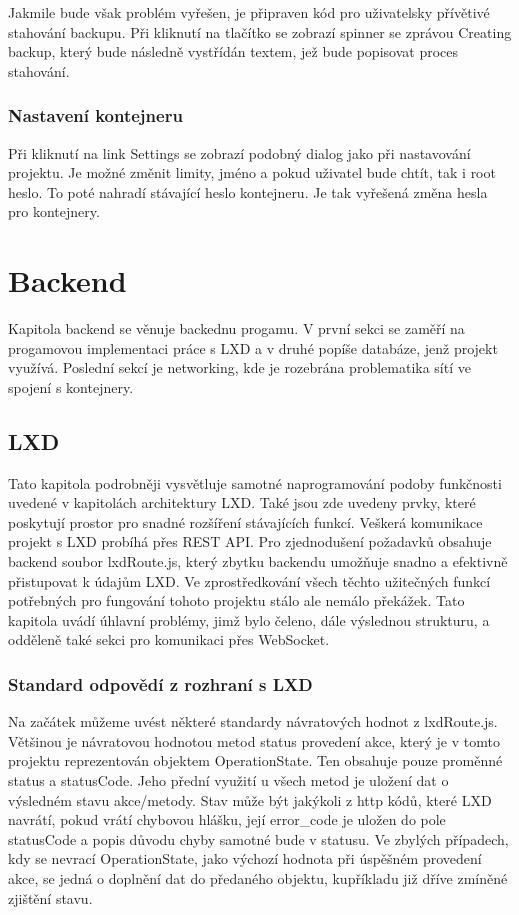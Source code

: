 \documentclass[a4paper,oneside,12pt]{report}
\begin{document}
Jakmile bude však problém vyřešen, je připraven kód pro uživatelsky přívětivé stahování backupu. Při kliknutí na tlačítko se zobrazí spinner se zprávou Creating backup, který bude následně vystřídán textem, jež bude popisovat proces stahování.

\subsection{Nastavení kontejneru}
Při kliknutí na link Settings se zobrazí podobný dialog jako při nastavování projektu. Je možné změnit limity, jméno a pokud uživatel bude chtít, tak i root heslo. To poté nahradí stávající heslo kontejneru. Je tak vyřešená změna hesla pro kontejnery.


\chapter{Backend}

Kapitola backend se věnuje backednu progamu.
V první sekci se zaměří na progamovou implementaci práce s LXD a v druhé popíše databáze, jenž projekt využívá.
Poslední sekcí je networking, kde je rozebrána problematika sítí ve spojení s kontejnery.

\section{LXD}

Tato kapitola podrobněji vysvětluje samotné naprogramování podoby funkčnosti uvedené v kapitolách architektury LXD. Také jsou zde uvedeny prvky, které poskytují prostor pro snadné rozšíření stávajících funkcí.
Veškerá komunikace projekt s LXD probíhá přes REST API. Pro zjednodušení požadavků obsahuje backend soubor lxdRoute.js, který zbytku backendu umožňuje snadno a efektivně přistupovat k údajům LXD. Ve zprostředkování všech těchto užitečných funkcí potřebných pro fungování tohoto projektu stálo ale nemálo překážek. Tato kapitola uvádí úhlavní problémy, jimž bylo čeleno, dále výslednou strukturu, a odděleně také sekci pro komunikaci přes WebSocket.

\subsection{Standard odpovědí z rozhraní s LXD}
Na začátek můžeme uvést některé standardy návratových hodnot z lxdRoute.js. Většinou je návratovou hodnotou metod status provedení akce, který je v tomto projektu reprezentován objektem OperationState. Ten obsahuje pouze proměnné status a statusCode. Jeho přední využití u všech metod je uložení dat o výsledném stavu akce/metody. Stav může být jakýkoli z http kódů, které LXD navrátí, pokud vrátí chybovou hlášku, její error\_code je uložen do pole statusCode a popis důvodu chyby samotné bude v statusu. Ve zbylých případech, kdy se nevrací OperationState, jako výchozí hodnota při úspěšném provedení akce, se jedná o doplnění dat do předaného objektu, kupříkladu již dříve zmíněné zjištění stavu.
\end{document}
